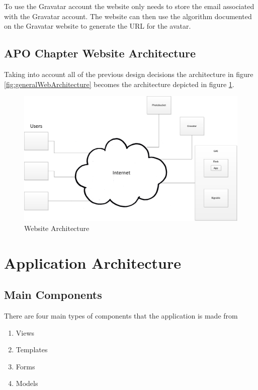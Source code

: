 \documentclass{article}
\begin{document}
To use the Gravatar account the website only needs to store the email associated with the Gravatar account. The website
can then use the algorithm documented on the Gravatar website to generate the URL for the avatar.

\subsection{APO Chapter Website Architecture}

Taking into account all of the previous design decisions the architecture in figure \ref{fig:generalWebArchitecture}
becomes the architecture depicted in figure \ref{fig:finalWebArchitecture}.

\FloatBarrier
\begin{figure}[h!]
\centering
\includegraphics[scale=.6]{img/finalWebArchitecture}
\caption{Website Architecture}
\label{fig:finalWebArchitecture}
\end{figure}
\FloatBarrier

\section{Application Architecture}

\subsection{Main Components}

There are four main types of components that the application is made from

\begin{enumerate}
\item Views
\item Templates
\item Forms
\item Models
\end{enumerate}
\end{document}
